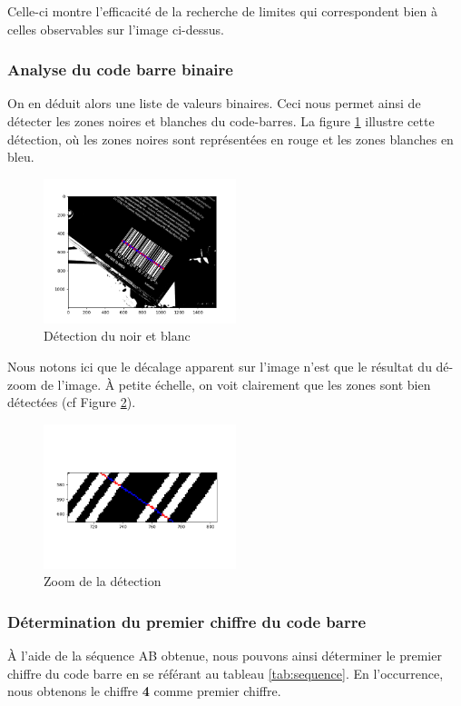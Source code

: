 \documentclass{rapport}
\begin{document}
Celle-ci montre l'efficacité
de la recherche de limites qui correspondent bien à celles observables sur l'image ci-dessus.

\subsubsection*{Analyse du code barre binaire}

On en déduit alors une liste de valeurs binaires. Ceci nous permet ainsi de détecter les zones noires et blanches du code-barres. 
La figure \ref{fig:detection} illustre cette détection, où les zones noires sont représentées en rouge et les zones blanches en bleu.

\begin{figure}[H] 
	\centering
	\includegraphics[width=0.5\textwidth]{images/code_seuille_couleur.png}
	\caption{Détection du noir et blanc}
	\label{fig:detection}
\end{figure}

Nous notons ici que le décalage apparent sur l'image n'est que le résultat du dé-zoom de l'image.
À petite échelle, on voit clairement que les zones sont bien détectées (cf Figure \ref{fig:detection_zoom}). 

\begin{figure}[H] 
	\centering
	\includegraphics[width=0.5\textwidth]{images/zoom_code_seuille_couleur.png}
	\caption{Zoom de la détection}
	\label{fig:detection_zoom}
\end{figure}

\subsubsection*{Détermination du premier chiffre du code barre}
À l'aide de la séquence AB obtenue, nous pouvons ainsi déterminer le premier chiffre du code barre en se référant au tableau \ref{tab:sequence}.
En l'occurrence, nous obtenons le chiffre \textbf{4} comme premier chiffre. 
\end{document}
